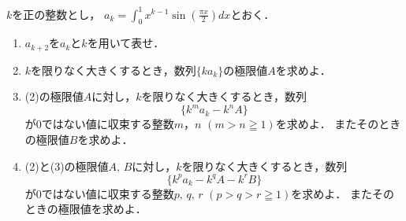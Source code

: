 \documentclass[../../main.tex]{subfiles}
\begin{document}
$k$を正の整数とし，
$\displaystyle a_k=\int_0^1x^{k-1}\sin\left(\frac{\pi x}{2}\right)dx$とおく．
\begin{enumerate}
  \item$a_{k+2}$を$a_k$と$k$を用いて表せ．
  \item$k$を限りなく大きくするとき，数列$\{ ka_k \}$の極限値$A$を求めよ．
  \item(2)の極限値$A$に対し，$k$を限りなく大きくするとき，数列
    \[ \{ k^ma_k-k^nA \} \]
    が0ではない値に収束する整数$m$，$n$ $(m>n\geqq1)$を求めよ．
    またそのときの極限値$B$を求めよ．
  \item(2)と(3)の極限値$A, \, B$に対し，$k$を限りなく大きくするとき，数列
    \[ \{ k^pa_k-k^qA-k^rB \} \]
    が0ではない値に収束する整数$p, \, q, \, r$ $(p>q>r\geqq1)$を求めよ．
    またそのときの極限値を求めよ．
\end{enumerate}
\end{document}
